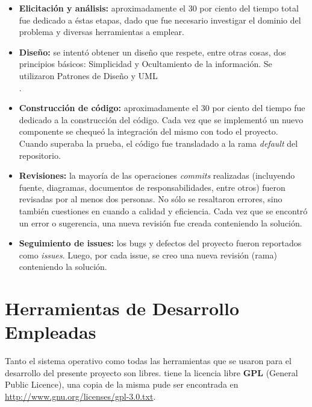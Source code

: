 \begin{itemize}
    \item \textbf{Elicitación y análisis:} aproximadamente el 30 por ciento del tiempo total fue dedicado a éstas etapas, dado que fue necesario investigar el dominio del problema y diversas herramientas a emplear.     

    \item \textbf{Diseño:} se intentó obtener un diseño que respete, entre otras cosas, dos principios básicos: Simplicidad y Ocultamiento de la información. Se utilizaron Patrones de Diseño\cite{Gamma} y UML \\ \cite{uml}.

    \item \textbf{Construcción de código:} aproximadamente el 30 por ciento del tiempo fue dedicado a la construcción del código. Cada vez que se implementó un nuevo componente se chequeó la integración del mismo con todo el proyecto. Cuando superaba la prueba, el código fue transladado a la rama \emph{default} del repositorio.

    \item \textbf{Revisiones:} la mayoría de las operaciones \emph{commits} realizadas (incluyendo fuente, diagramas, documentos de responsabilidades, entre otros) fueron revisadas por al menos dos personas. No sólo se resaltaron errores, sino también cuestiones en cuando a calidad y eficiencia. Cada vez que se encontró un error o sugerencia, una nueva revisión fue creada conteniendo la solución.

    \item \textbf{Seguimiento de issues:} los bugs y defectos del proyecto fueron reportados como \emph{issues}. Luego, por cada issue, se creo una nueva revisión (rama) conteniendo la solución.
\end{itemize}

\section{Herramientas de Desarrollo Empleadas}
\par Tanto el sistema operativo como todas las herramientas que se usaron para el desarrollo del presente proyecto son libres. \remo tiene la licencia libre \textbf{GPL} (General Public Licence), una copia de la misma pude ser encontrada en \url{http://www.gnu.org/licenses/gpl-3.0.txt}.

